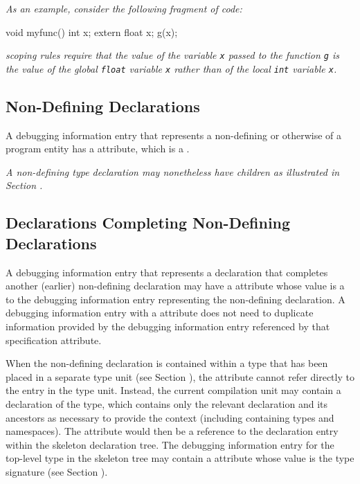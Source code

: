 \textit{As an example, consider the following fragment of  code:}

\begin{nlnlisting}
void myfunc()
{
  int x;
  {
    extern float x;
    g(x);
  }
}
\end{nlnlisting}


\textit{ scoping rules require that the 
value of the variable \texttt{x} passed to the function 
\texttt{g} is the value of the global \texttt{float} 
variable \texttt{x} rather than of the local \texttt{int} 
variable \texttt{x}.}

\subsection{Non-Defining Declarations}
A debugging information entry that 
represents a non-defining 
or otherwise 
of a program entity has a
\DWATdeclarationDEFN{} attribute, which is a 
.

\textit{A non-defining type declaration may nonetheless have 
children as illustrated in Section
.}


\subsection{Declarations Completing Non-Defining Declarations}
\hypertarget{chap:DWATspecificationincompletenondefiningorseparatedeclaration}{}
A debugging information entry that represents a declaration
that completes another (earlier) non-defining declaration may have a 
\DWATspecificationDEFN{}
attribute whose value is a  to
the debugging information entry representing the non-defining declaration. 
A debugging information entry with a 
\DWATspecificationNAME{} 
attribute does not need to duplicate information provided by the 
debugging information entry referenced by that specification attribute.

When the non-defining declaration is contained within a type that has
been placed in a separate type unit (see Section ), 
the \DWATspecification{} attribute cannot refer directly to the entry in
the type unit. Instead, the current compilation unit may contain a
 declaration of the type, which contains only the relevant
declaration and its ancestors as necessary to provide the context
(including containing types and namespaces). The \DWATspecification{}
attribute would then be a reference to the declaration entry within
the skeleton declaration tree. The debugging information entry for the
top-level type in the skeleton tree may contain a \DWATsignature{}
attribute whose value is the type signature 
(see Section ).

